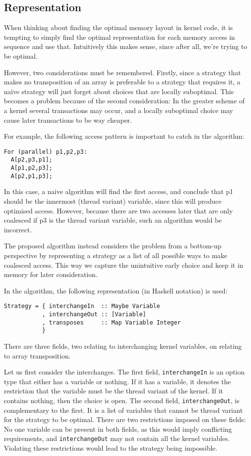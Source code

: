\documentclass{article}
\begin{document}
\subsection{Representation}
When thinking about finding the optimal memory layout in kernel code, it is tempting to simply find the optimal representation for each memory access in
sequence and use that. Intuitively this makes sense, since after all, we’re trying to be optimal. 

However, two considerations must be remembered. Firstly, since a strategy that makes no transposition of an array is preferable to a strategy that requires it,
a naïve strategy will just forget about choices that are locally suboptimal. This becomes a problem because of the second consideration: In the greater scheme
of a kernel several transactions may occur, and a locally suboptimal choice may cause later transactions to be way cheaper.

For example, the following access pattern is important to catch in the algorithm:
\begin{verbatim}
For (parallel) p1,p2,p3:
  A[p2,p3,p1];
  A[p1,p2,p3];
  A[p2,p1,p3];
\end{verbatim}

In this case, a naive algorithm will find the first access, and conclude that p1 should be the innermost (thread variant) variable, since this will produce
optimised access. However, because there are two accesses later that are only coalesced if p3 is the thread variant variable, such an algorithm would be
incorrect.

The proposed algorithm instead considers the problem from a bottom-up perspective by representing a strategy as a list of all possible ways to make coalesced
access. This way we capture the unintuitive early choice and keep it in memory for later consideration.

In the algorithm, the following representation (in Haskell notation) is used:
\begin{verbatim}
Strategy = { interchangeIn  :: Maybe Variable
           , interchangeOut :: [Variable]
           , transposes     :: Map Variable Integer
           }
\end{verbatim}

There are three fields, two relating to interchanging kernel variables, on relating to array transposition.

Let us first consider the interchanges. The first field, \verb`interchangeIn` is an option type that either has a variable or nothing. If it has a variable, it
denotes the restriction that the variable must be the thread variant of the kernel. If it contains nothing, then the choice is open. The second field,
\verb`interchangeOut`, is complementary to the first. It is a list of variables that cannot be  thread variant for the strategy to be optimal. There are two
restrictions imposed on these fields: No one variable can be present in both fields, as this would imply conflicting requirements, and \verb`interchangeOut` may
not contain all the kernel variables. Violating these restrictions would lead to the strategy being impossible.
\end{document}

